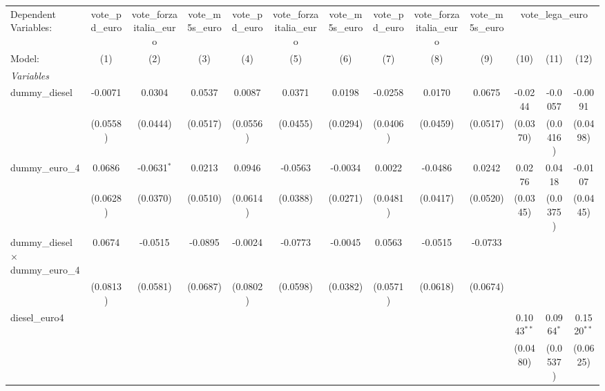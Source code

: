 \begingroup
\centering
\begin{tabular}{lcccccccccccc}
   \tabularnewline \midrule \midrule
   Dependent Variables: & vote\_pd\_euro & vote\_forzaitalia\_euro & vote\_m5s\_euro & vote\_pd\_euro & vote\_forzaitalia\_euro & vote\_m5s\_euro & vote\_pd\_euro & vote\_forzaitalia\_euro & vote\_m5s\_euro & \multicolumn{3}{c}{vote\_lega\_euro}\\
   Model:                                    & (1)      & (2)           & (3)      & (4)      & (5)      & (6)      & (7)      & (8)      & (9)      & (10)          & (11)         & (12)\\  
   \midrule
   \emph{Variables}\\
   dummy\_diesel                             & -0.0071  & 0.0304        & 0.0537   & 0.0087   & 0.0371   & 0.0198   & -0.0258  & 0.0170   & 0.0675   & -0.0244       & -0.0057      & -0.0091\\   
                                             & (0.0558) & (0.0444)      & (0.0517) & (0.0556) & (0.0455) & (0.0294) & (0.0406) & (0.0459) & (0.0517) & (0.0370)      & (0.0416)     & (0.0498)\\   
   dummy\_euro\_4                            & 0.0686   & -0.0631$^{*}$ & 0.0213   & 0.0946   & -0.0563  & -0.0034  & 0.0022   & -0.0486  & 0.0242   & 0.0276        & 0.0418       & -0.0107\\   
                                             & (0.0628) & (0.0370)      & (0.0510) & (0.0614) & (0.0388) & (0.0271) & (0.0481) & (0.0417) & (0.0520) & (0.0345)      & (0.0375)     & (0.0445)\\   
   dummy\_diesel $\times$ dummy\_euro\_4     & 0.0674   & -0.0515       & -0.0895  & -0.0024  & -0.0773  & -0.0045  & 0.0563   & -0.0515  & -0.0733  &               &              &   \\   
                                             & (0.0813) & (0.0581)      & (0.0687) & (0.0802) & (0.0598) & (0.0382) & (0.0571) & (0.0618) & (0.0674) &               &              &   \\   
   diesel\_euro4                             &          &               &          &          &          &          &          &          &          & 0.1043$^{**}$ & 0.0964$^{*}$ & 0.1520$^{**}$\\   
                                             &          &               &          &          &          &          &          &          &          & (0.0480)      & (0.0537)     & (0.0625)\\   

\end{tabular}
